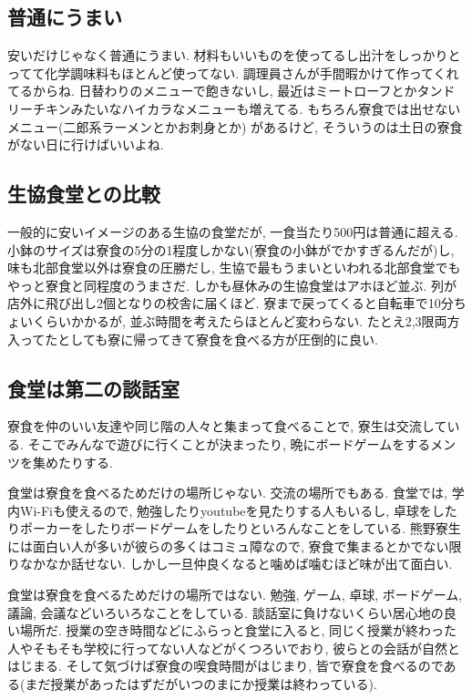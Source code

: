 \documentclass[10pt,b5jsbook,dvips,dvipdfmx,openany]{jsbook}
\theoremstyle{definition}
\begin{document}
		\subsection{普通にうまい}
		安いだけじゃなく普通にうまい. 材料もいいものを使ってるし出汁をしっかりとってて化学調味料もほとんど使ってない. 調理員さんが手間暇かけて作ってくれてるからね. 日替わりのメニューで飽きないし, 最近はミートローフとかタンドリーチキンみたいなハイカラなメニューも増えてる. もちろん寮食では出せないメニュー(二郎系ラーメンとかお刺身とか) があるけど, そういうのは土日の寮食がない日に行けばいいよね. 

		\subsection{生協食堂との比較}
		一般的に安いイメージのある生協の食堂だが, 一食当たり500円は普通に超える. 小鉢のサイズは寮食の5分の1程度しかない(寮食の小鉢がでかすぎるんだが)し, 味も北部食堂以外は寮食の圧勝だし, 生協で最もうまいといわれる北部食堂でもやっと寮食と同程度のうまさだ. しかも昼休みの生協食堂はアホほど並ぶ. 列が店外に飛び出し2個となりの校舎に届くほど. 寮まで戻ってくると自転車で10分ちょいくらいかかるが, 並ぶ時間を考えたらほとんど変わらない. たとえ2,3限両方入ってたとしても寮に帰ってきて寮食を食べる方が圧倒的に良い. 

		\subsection{食堂は第二の談話室}
		寮食を仲のいい友達や同じ階の人々と集まって食べることで, 寮生は交流している. そこでみんなで遊びに行くことが決まったり, 晩にボードゲームをするメンツを集めたりする. 

		食堂は寮食を食べるためだけの場所じゃない. 交流の場所でもある. 食堂では, 学内Wi-Fiも使えるので, 勉強したりyoutubeを見たりする人もいるし, 卓球をしたりポーカーをしたりボードゲームをしたりといろんなことをしている. 熊野寮生には面白い人が多いが彼らの多くはコミュ障なので, 寮食で集まるとかでない限りなかなか話せない. しかし一旦仲良くなると噛めば噛むほど味が出て面白い. 

		食堂は寮食を食べるためだけの場所ではない. 勉強, ゲーム, 卓球, ボードゲーム, 議論, 会議などいろいろなことをしている. 談話室に負けないくらい居心地の良い場所だ. 授業の空き時間などにふらっと食堂に入ると, 同じく授業が終わった人やそもそも学校に行ってない人などがくつろいでおり, 彼らとの会話が自然とはじまる. そして気づけば寮食の喫食時間がはじまり, 皆で寮食を食べるのである(まだ授業があったはずだがいつのまにか授業は終わっている). 
\end{document}
